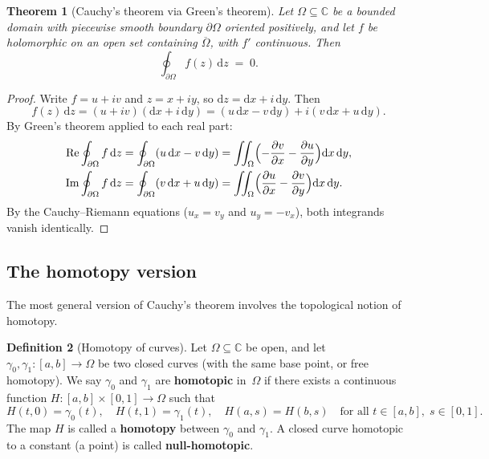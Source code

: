 \documentclass[12pt,a4paper,openany]{book}
\theoremstyle{definition}
\newtheorem{definition}{Definition}[chapter]
\theoremstyle{plain}
\newtheorem{theorem}[definition]{Theorem}
\theoremstyle{remark}
\newcommand{\C}{\mathbb{C}}
\DeclareMathOperator{\re}{Re}
\DeclareMathOperator{\im}{Im}
\newcommand{\dd}{\mathrm{d}}
\begin{document}
\begin{theorem}[Cauchy's theorem via Green's theorem]%
\label{thm:cauchy-via-green}
Let $\Omega\subseteq\C$ be a bounded domain with piecewise smooth boundary
$\partial\Omega$ oriented positively, and let $f$ be holomorphic on an open set
containing $\overline{\Omega}$, with $f'$ continuous.  Then
\[
  \oint_{\partial\Omega} f(z)\,\dd z \;=\; 0.
\]
\end{theorem}

\begin{proof}
Write $f = u+iv$ and $z = x+iy$, so $\dd z = \dd x + i\,\dd y$.  Then
\[
  f(z)\,\dd z = (u+iv)(\dd x+i\,\dd y)
  = (u\,\dd x - v\,\dd y) + i(v\,\dd x + u\,\dd y).
\]
By Green's theorem applied to each real part:
\begin{align*}
  \re\oint_{\partial\Omega}f\,\dd z
  &= \oint_{\partial\Omega}(u\,\dd x-v\,\dd y)
  = \iint_\Omega\Bigl(-\frac{\partial v}{\partial x}
    -\frac{\partial u}{\partial y}\Bigr)\dd x\,\dd y, \\
  \im\oint_{\partial\Omega}f\,\dd z
  &= \oint_{\partial\Omega}(v\,\dd x+u\,\dd y)
  = \iint_\Omega\Bigl(\frac{\partial u}{\partial x}
    -\frac{\partial v}{\partial y}\Bigr)\dd x\,\dd y.
\end{align*}
By the Cauchy--Riemann equations ($u_x=v_y$ and $u_y=-v_x$), both integrands
vanish identically.
\end{proof}

\subsection{The homotopy version}

The most general version of Cauchy's theorem involves the topological notion
of homotopy.

\begin{definition}[Homotopy of curves]\label{def:homotopy}
Let $\Omega\subseteq\C$ be open, and let $\gamma_0,\gamma_1\colon[a,b]\to\Omega$
be two closed curves (with the same base point, or free homotopy).  We say
$\gamma_0$ and $\gamma_1$ are \textbf{homotopic} in~$\Omega$
if there exists a continuous function $H\colon[a,b]\times[0,1]\to\Omega$
such that
\[
  H(t,0) = \gamma_0(t), \quad
  H(t,1) = \gamma_1(t), \quad
  H(a,s) = H(b,s) \quad\text{for all } t\in[a,b],\;s\in[0,1].
\]
The map $H$ is called a \textbf{homotopy} between $\gamma_0$ and $\gamma_1$.
A closed curve homotopic to a constant (a point) is called
\textbf{null-homotopic}.
\end{definition}
\end{document}
